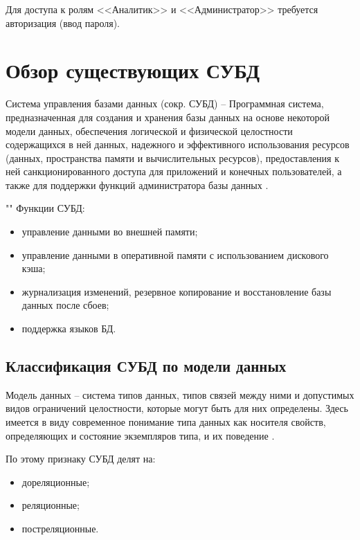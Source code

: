 \documentclass[a4paper,14pt]{extreport}
\begin{document}
Для доступа к ролям <<Аналитик>> и <<Администратор>> требуется авторизация (ввод пароля).

\section{Обзор существующих СУБД}

Система управления базами данных (сокр. СУБД) -- Программная система, предназначенная для создания и хранения базы данных на основе некоторой модели данных, обеспечения логической и физической целостности содержащихся в ней данных, надежного и эффективного использования ресурсов (данных, пространства памяти и вычислительных ресурсов), предоставления к ней санкционированного доступа для приложений и конечных пользователей, а также для поддержки 
функций администратора базы данных \cite{kogal}.

""\newline
Функции СУБД:

\begin{itemize}
	\setlength\itemsep{0.01em}
	\item управление данными во внешней памяти;
	\item управление данными в оперативной памяти с использованием дискового кэша;
	\item журнализация изменений, резервное копирование и восстановление базы данных после сбоев;
	\item поддержка языков БД.
\end{itemize}

\subsection{Классификация СУБД по модели данных}

Модель данных --  система типов данных, типов связей между ними и допустимых видов ограничений целостности, которые могут быть для них определены. Здесь имеется в виду современное понимание типа данных как носителя свойств, определяющих и состояние экземпляров типа, и их поведение \cite{kogal}.

По этому признаку СУБД делят на:

\begin{itemize}
	\setlength\itemsep{0.01em}
	\item дореляционные;
	\item реляционные;
	\item постреляционные.
\end{itemize}
\end{document}
